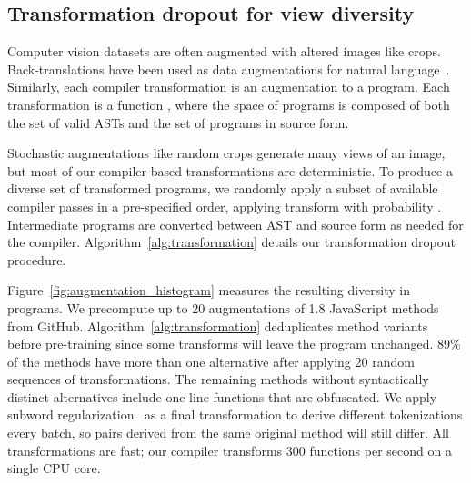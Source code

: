 \documentclass{article}
\newcommand{\million}[0]{}
\begin{document}
\subsection{Transformation dropout for view diversity} \label{sec:diverse_aug}
Computer vision datasets are often augmented with altered images like crops. Back-translations have been used as data augmentations for natural language~\cite{sennrich-etal-2016-improving}. Similarly, each compiler transformation is an augmentation to a program. Each transformation is a function , where the space of programs  is composed of both the set of valid ASTs and the set of programs in source form.

Stochastic augmentations like random crops generate many views of an image, but most of our compiler-based transformations are deterministic. To produce a diverse set of transformed programs, we randomly apply a subset of available compiler passes in a pre-specified order, applying transform  with probability . Intermediate programs are converted between AST and source form as needed for the compiler. Algorithm~\ref{alg:transformation} details our transformation dropout procedure.

Figure~\ref{fig:augmentation_histogram} measures the resulting diversity in programs. We precompute up to 20 augmentations of 1.8\million{} JavaScript methods from GitHub. Algorithm~\ref{alg:transformation} deduplicates method variants before pre-training since some transforms will leave the program unchanged. 89\% of the methods have more than one alternative after applying 20 random sequences of transformations.
The remaining methods without syntactically distinct alternatives include one-line functions that are obfuscated.
We apply subword regularization~\citep{kudo2018subword} as a final transformation to derive different tokenizations every batch, so pairs derived from the same original method will still differ.
All transformations are fast; our compiler transforms 300 functions per second on a single CPU core.
\end{document}
